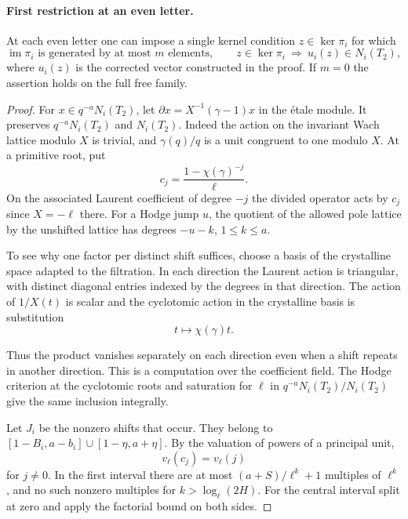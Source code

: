 \paragraph{First restriction at an even letter.}
\begin{lemma}
At each even letter one can impose a single kernel condition \(z\in\ker\pi_i\) for which
\[
 \operatorname{im}\pi_i\text{ is generated by at most }m\text{ elements},\qquad z\in\ker\pi_i\ \Longrightarrow\ u_i(z)\in N_i(T_2),
\]
where \(u_i(z)\) is the corrected vector constructed in the proof. If \(m=0\) the assertion holds on
the full free family.
\end{lemma}
\begin{proof}
For \(x\in q^{-a}N_i(T_2)\), let
\(\partial x=X^{-1}(\gamma-1)x\) in the \'etale module.
It preserves \(q^{-a}N_i(T_2)\) and \(N_i(T_2)\).
Indeed the action on the invariant Wach lattice modulo \(X\)
is trivial, and \(\gamma(q)/q\) is a unit congruent to one
modulo \(X\). At a primitive root, put
\[
             c_j=\frac{1-\chi(\gamma)^{-j}}{\ell}.
\]
On the associated Laurent coefficient of degree \(-j\) the
divided operator acts by \(c_j\) since \(X=-\ell\) there.
For a Hodge jump \(u\), the quotient of the allowed pole lattice
by the unshifted lattice has degrees \(-u-k\), \(1\le k\le a\).

To see why one factor per distinct shift suffices, choose a basis
of the crystalline space adapted to the filtration. In each
direction the Laurent action is triangular, with distinct
diagonal entries indexed by the degrees in that direction.
The action of \(1/X(t)\) is scalar and the cyclotomic action
in the crystalline basis is substitution
\[
 t\mapsto\chi(\gamma)t.
\]

Thus the product vanishes separately on each direction even
when a shift repeats in another direction. This is a computation
over the coefficient field. The Hodge criterion at the cyclotomic
roots and saturation for \(\ell\) in \(q^{-a}N_i(T_2)/N_i(T_2)\)
give the same inclusion integrally.

Let \(J_i\) be the nonzero shifts that occur. They belong to
\([1-B_i,a-b_i]\cup[1-\eta,a+\eta]\).
By the valuation of powers of a principal unit,
\[
 v_\ell(c_j)=v_\ell(j)
\]
for \(j\ne0\). In the first
interval there are at most \((a+S)/\ell^k+1\) multiples of
\(\ell^k\), and no such nonzero multiples for
\(k>\log_\ell(2H)\). For the central interval split at zero
and apply the factorial bound on both sides.


\end{proof}
